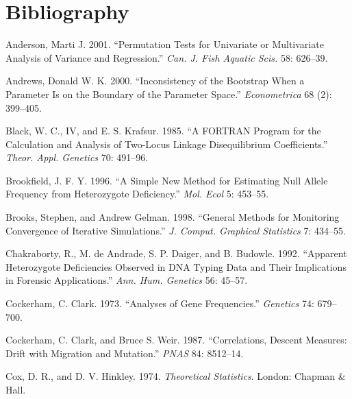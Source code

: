\documentclass[
  12pt,
]{book}
\newlength{\cslhangindent}
\newlength{\cslentryspacingunit} %
\newenvironment{CSLReferences}[2] %
 {%
  \setlength{\parindent}{0pt}
  \ifodd #1
  \let\oldpar\par
  \def\par{\hangindent=\cslhangindent\oldpar}
  \fi
  \setlength{\parskip}{#2\cslentryspacingunit}
 }%
 {}
\begin{document}
\printindex

\hypertarget{bibliography}{%
\chapter*{Bibliography}\label{bibliography}}

\hypertarget{refs}{}
\begin{CSLReferences}{1}{0}
\leavevmode{}%
Anderson, Marti J. 2001. {``Permutation Tests for Univariate or Multivariate Analysis of Variance and Regression.''} \emph{Can. J. Fish Aquatic Scis.} 58: 626--39.

\leavevmode{}%
Andrews, Donald W. K. 2000. {``Inconsistency of the Bootstrap When a Parameter Is on the Boundary of the Parameter Space.''} \emph{Econometrica} 68 (2): 399--405.

\leavevmode{}%
Black, W. C., IV, and E. S. Krafsur. 1985. {``A {FORTRAN} Program for the Calculation and Analysis of Two-Locus Linkage Disequilibrium Coefficients.''} \emph{Theor. Appl. Genetics} 70: 491--96.

\leavevmode{}%
Brookfield, J. F. Y. 1996. {``A Simple New Method for Estimating Null Allele Frequency from Heterozygote Deficiency.''} \emph{Mol. Ecol} 5: 453--55.

\leavevmode{}%
Brooks, Stephen, and Andrew Gelman. 1998. {``General Methods for Monitoring Convergence of Iterative Simulations.''} \emph{J. Comput. Graphical Statistics} 7: 434--55.

\leavevmode{}%
Chakraborty, R., M. de Andrade, S. P. Daiger, and B. Budowle. 1992. {``Apparent Heterozygote Deficiencies Observed in {DNA} Typing Data and Their Implications in Forensic Applications.''} \emph{Ann. Hum. Genetics} 56: 45--57.

\leavevmode{}%
Cockerham, C. Clark. 1973. {``Analyses of Gene Frequencies.''} \emph{Genetics} 74: 679--700.

\leavevmode{}%
Cockerham, C. Clark, and Bruce S. Weir. 1987. {``Correlations, Descent Measures: Drift with Migration and Mutation.''} \emph{PNAS} 84: 8512--14.

\leavevmode{}%
Cox, D. R., and D. V. Hinkley. 1974. \emph{Theoretical Statistics}. London: Chapman \& Hall.


\end{CSLReferences}
\end{document}
